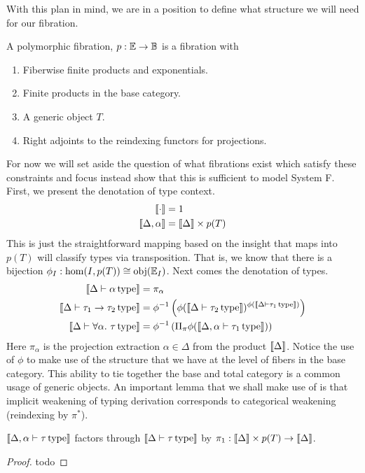 With this plan in mind, we are in a position to define what structure
we will need for our fibration.
\begin{defn}\label{defn:systemf:polymorphicfibration}
  A polymorphic fibration, $p : \mathbb{E} \to \mathbb{B}$ is a fibration with
  \begin{enumerate}
  \item Fiberwise finite products and exponentials.
  \item Finite products in the base category.
  \item A generic object $T$.
  \item Right adjoints to the reindexing functors for projections.
  \end{enumerate}
\end{defn}
For now we will set aside the question of what fibrations exist which
satisfy these constraints and focus instead show that this is
sufficient to model System F. First, we present the denotation of
type context.
\begin{align*}
  \llbracket \cdot \rrbracket &= 1\\
  \llbracket \Delta, \alpha \rrbracket &= \llbracket \Delta \rrbracket \times p(T)
\end{align*}
This is just the straightforward mapping based on the insight that
maps into $p(T)$ will classify types via transposition. That is, we
know that there is a bijection
$\phi_I : \hom(I, p(T)) \cong \operatorname{obj}(\mathbb{E}_I)$.  Next comes the denotation
of types.
\begin{align*}
  \llbracket \Delta \vdash \alpha\,\mathrm{type} \rrbracket &= \pi_{\alpha}\\
  \llbracket \Delta \vdash \tau_1 \to \tau_2\,\mathrm{type} \rrbracket &=
  \phi^{-1}\left(\phi(\llbracket \Delta \vdash \tau_2\,\mathrm{type} \rrbracket)^{\phi(\llbracket \Delta \vdash \tau_1\,\mathrm{type} \rrbracket)}\right)\\
  \llbracket \Delta \vdash \forall \alpha.\ \tau\,\mathrm{type} \rrbracket &=
  \phi^{-1}\left(\Pi_{\pi}\phi(\llbracket \Delta, \alpha \vdash \tau_1\,\mathrm{type} \rrbracket)\right)
\end{align*}
Here $\pi_{\alpha}$ is the projection extraction $\alpha \in \Delta$
from the product $\llbracket \Delta \rrbracket$. Notice the use of $\phi$ to make
use of the structure that we have at the level of fibers in the base
category. This ability to tie together the base and total category is
a common usage of generic objects. An important lemma that we shall
make use of is that implicit weakening of typing derivation
corresponds to categorical weakening (reindexing by $\pi^*$).

\begin{lem}\label{lem:systemf:weakening}
  $\llbracket \Delta, \alpha \vdash \tau\,\mathrm{type} \rrbracket$ factors through
  $\llbracket \Delta \vdash \tau\,\mathrm{type} \rrbracket$ by
  $\pi_1 : \llbracket \Delta \rrbracket \times p(T) \to \llbracket \Delta \rrbracket$.
\end{lem}
\begin{proof}
  todo
\end{proof}

